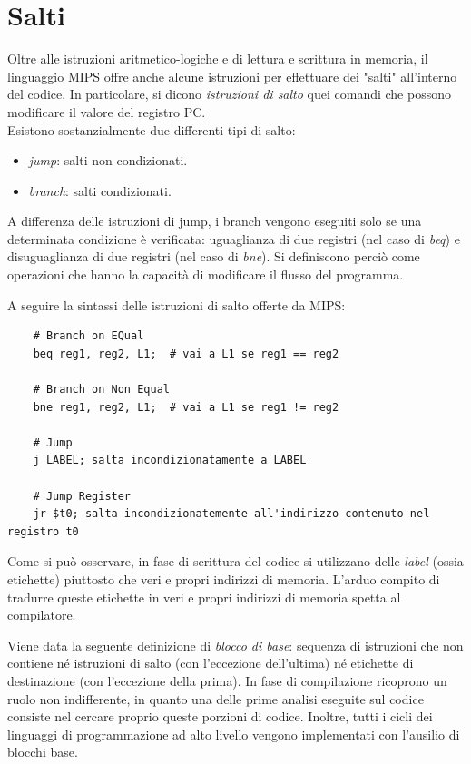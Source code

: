 \documentclass[class=book, crop=false]{standalone}
\begin{document}
\section{Salti}
Oltre alle istruzioni aritmetico-logiche e di lettura e scrittura in memoria, il linguaggio MIPS offre anche alcune istruzioni per effettuare dei "salti" all'interno del codice. In particolare, si dicono \emph{istruzioni di salto} quei comandi che possono modificare il valore del registro PC.\\
Esistono sostanzialmente due differenti tipi di salto:
\begin{itemize}
	\item \emph{jump}: salti non condizionati.
	\item \emph{branch}: salti condizionati.
\end{itemize}
A differenza delle istruzioni di jump, i branch vengono eseguiti solo se una determinata condizione è verificata: uguaglianza di due registri (nel caso di \emph{beq}) e disuguaglianza di due registri (nel caso di \emph{bne}). Si definiscono perciò come operazioni che hanno la capacità di modificare il flusso del programma.

A seguire la sintassi delle istruzioni di salto offerte da MIPS:
\begin{verbatim}
	# Branch on EQual
	beq reg1, reg2, L1;  # vai a L1 se reg1 == reg2

	# Branch on Non Equal
	bne reg1, reg2, L1;  # vai a L1 se reg1 != reg2

	# Jump
	j LABEL; salta incondizionatamente a LABEL

	# Jump Register
	jr $t0; salta incondizionatemente all'indirizzo contenuto nel registro t0
\end{verbatim}
Come si può osservare, in fase di scrittura del codice si utilizzano delle \emph{label} (ossia etichette) piuttosto che veri e propri indirizzi di memoria. L'arduo compito di tradurre queste etichette in veri e propri indirizzi di memoria spetta al compilatore.

Viene data la seguente definizione di \emph{blocco di base}: sequenza di istruzioni che non contiene né istruzioni di salto (con l’eccezione dell’ultima) né etichette di destinazione (con l’eccezione della prima). In fase di compilazione ricoprono un ruolo non indifferente, in quanto una delle prime analisi eseguite sul codice consiste nel cercare proprio queste porzioni di codice. Inoltre, tutti i cicli dei linguaggi di programmazione ad alto livello vengono implementati con l'ausilio di blocchi base.
\end{document}
